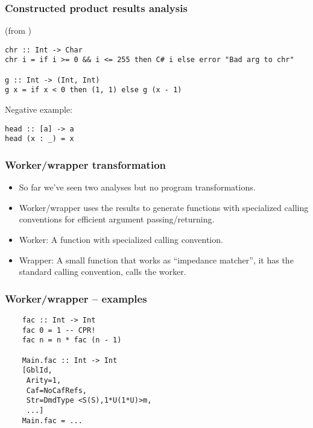 \documentclass{beamer}
\begin{document}
\begin{frame}[fragile]
    \frametitle{Constructed product results analysis}

    (from \cite{cpr}) \\

    \begin{verbatim}
chr :: Int -> Char
chr i = if i >= 0 && i <= 255 then C# i else error "Bad arg to chr"

g :: Int -> (Int, Int)
g x = if x < 0 then (1, 1) else g (x - 1)
    \end{verbatim}

    Negative example: \\

    \begin{verbatim}
head :: [a] -> a
head (x : _) = x
    \end{verbatim}
\end{frame}

\begin{frame}
    \frametitle{Worker/wrapper transformation}

    \begin{itemize}
        \item So far we've seen two analyses but no program transformations.
        \item Worker/wrapper uses the results to generate functions with
            specialized calling conventions for efficient argument
            passing/returning.
        \item
            Worker: A function with specialized calling convention.
        \item
            Wrapper: A small function that works as ``impedance matcher'', it has
            the standard calling convention, calls the worker.
    \end{itemize}
\end{frame}

\begin{frame}[fragile]
    \frametitle{Worker/wrapper -- examples}

    \begin{verbatim}
    fac :: Int -> Int
    fac 0 = 1 -- CPR!
    fac n = n * fac (n - 1)

    Main.fac :: Int -> Int
    [GblId,
     Arity=1,
     Caf=NoCafRefs,
     Str=DmdType <S(S),1*U(1*U)>m,
     ...]
    Main.fac = ...
    \end{verbatim}

\end{frame}
\end{document}

